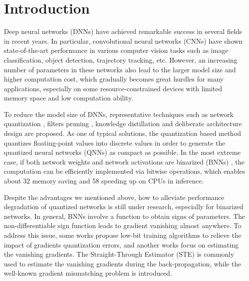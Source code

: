 \documentclass[runningheads]{llncs}
\begin{document}
\section{Introduction}
Deep neural networks (DNNs) have achieved remarkable success in several fields in recent years.
In particular, convolutional neural networks (CNNs) have shown state-of-the-art
performance in various computer vision tasks such as image classification, object detection, trajectory tracking, etc.
However, an increasing number of parameters in these networks also
lead to the larger model size and higher computation cost,
which gradually becomes great hurdles for many applications,
especially on some resource-constrained devices with limited memory space
and low computation ability.

To reduce the model size of DNNs,
representative techniques such as
network quantization \cite{Zhou2016DoReFa,hou2016loss,pact2018,jung2019learning,lahoud2019self},
filters pruning \cite{Luo2017ThiNet,he2017channel,liu2017learning},
knowledge distillation \cite{Hinton2015Distilling,BSS2019,liu2019kr}
and deliberate architecture design \cite{Li2017,cheng2017survey} are proposed.
As one of typical solutions, the quantization based method quantizes
floating-point values into discrete values in order to generate the quantized neural networks (QNNs) as compact as possible.
In the most extreme case,
if both network weights and network activations are binarized (BNNs) \cite{courbariaux2015binaryconnect},
the computation can be efficiently implemented via bitwise operations,
which enables about 32  memory saving and 58  speeding up \cite{rastegari2016xnor} on CPUs in inference.

Despite the advantages we mentioned above,
how to alleviate performance degradation of quantized networks is still under research,
especially for binarized networks.
In general, BNNs involve a  function to obtain signs of parameters.
The non-differentiable sign function leads to gradient vanishing almost anywhere.
To address this issue, some works \cite{liu2020bamsprob,Zhu2020} propose low-bit training algorithms to relieve the impact of gradients quantization errors,
and another works focus on estimating the vanishing gradients. The Straight-Through Estimator (STE) \cite{ste2013}
is commonly used to estimate the vanishing gradients during the back-propagation,
while the well-known gradient mismatching problem \cite{yin2019understanding,hou2019analysis,binaryop2019} is introduced.
\end{document}
